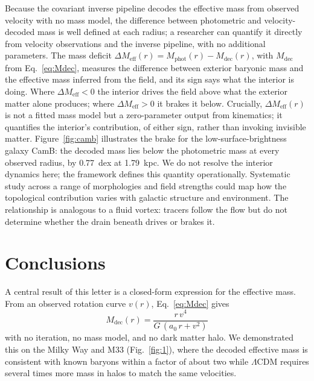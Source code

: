 \documentclass[fleqn,usenatbib]{mnras}
\begin{document}
Because the covariant inverse pipeline decodes the effective mass from observed velocity with no mass model, the difference between photometric and velocity-decoded mass is well defined at each radius; a researcher can quantify it directly from velocity observations and the inverse pipeline, with no additional parameters. The mass deficit $\Delta M_{\mathrm{eff}}(r) = M_{\mathrm{phot}}(r) - M_{\mathrm{dec}}(r)$, with $M_{\mathrm{dec}}$ from Eq.~\ref{eq:Mdec}, measures the difference between exterior baryonic mass and the effective mass inferred from the field, and its sign says what the interior is doing. Where $\Delta M_{\mathrm{eff}} < 0$ the interior drives the field above what the exterior matter alone produces; where $\Delta M_{\mathrm{eff}} > 0$ it brakes it below. Crucially, $\Delta M_{\mathrm{eff}}(r)$ is not a fitted mass model but a zero-parameter output from kinematics; it quantifies the interior's contribution, of either sign, rather than invoking invisible matter. Figure~\ref{fig:camb} illustrates the brake for the low-surface-brightness galaxy CamB: the decoded mass lies below the photometric mass at every observed radius, by 0.77~dex at 1.79~kpc. We do not resolve the interior dynamics here; the framework defines this quantity operationally. Systematic study across a range of morphologies and field strengths could map how the topological contribution varies with galactic structure and environment. The relationship is analogous to a fluid vortex: tracers follow the flow but do not determine whether the drain beneath drives or brakes it.

\section{Conclusions}
\label{sec:conclusions}

A central result of this letter is a closed-form expression for the effective mass. From an observed rotation curve $v(r)$, Eq.~\ref{eq:Mdec} gives
\begin{equation*}
M_{\mathrm{dec}}(r) = \frac{r\,v^4}{G\,(a_0\,r + v^2)}
\end{equation*}
with no iteration, no mass model, and no dark matter halo. We demonstrated this on the Milky Way and M33 (Fig.~\ref{fig:1}), where the decoded effective mass is consistent with known baryons within a factor of about two while $\Lambda$CDM requires several times more mass in halos to match the same velocities.
\end{document}
